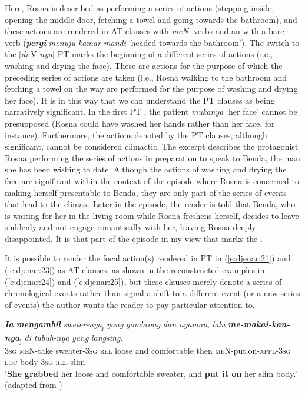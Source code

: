 \documentclass[output=paper
,modfonts
,nonflat]{langsci/langscibook}
\begin{document}
\noindent\largerpage
Here, Rosna is described as performing a series of actions (stepping inside, opening the middle door, fetching a towel and going towards the bathroom), and these actions are rendered in AT clauses with \textit{meN}- verbs and an  with a bare verb (\textbf{\textit{pergi}} \textit{menuju kamar mandi} ‘headed towards the bathroom’). The switch to the [\textit{di}-V-\textit{nya}] PT  marks the beginning of a different series of actions (i.e., washing and drying the face). These are actions for the purpose of which the preceding series of actions are taken (i.e., Rosna walking to the bathroom and fetching a towel on the way are performed for the purpose of washing and drying her face). It is in this way that we can understand the PT clauses as being narratively significant. In the first PT , the patient \textit{mukanya} ‘her face’ cannot be presupposed (Rosna could have washed her hands rather than her face, for instance). Furthermore, the actions denoted by the PT clauses, although significant, cannot be considered climactic. The excerpt describes the protagonist Rosna performing the series of actions in preparation to speak to Benda, the man she has been wishing to date. Although the actions of washing and drying the face are significant within the context of the episode where Rosna is concerned to making herself presentable to Benda, they are only part of the series of events that lead to the climax. Later in the episode, the reader is told that Benda, who is waiting for her in the living room while Rosna freshens herself, decides to leave suddenly and not engage romantically with her, leaving Rosna deeply disappointed. It is that part of the episode in my view that marks the .  

It is possible to render the focal action(s) rendered in PT in (\ref{e:djenar:21}) and (\ref{e:djenar:23}) as AT clauses, as shown in the reconstructed examples in (\ref{e:djenar:24}) and (\ref{e:djenar:25}), but these clauses merely denote a series of chronological events rather than signal a shift to a different event (or a new series of events) the author wants the reader to pay particular attention to.

\begin{exe}
	\ex\label{e:djenar:24}
	\gll \textbf{\textit{Ia}} \textbf{\textit{mengambil}} \textit{sweter-nya}\textsubscript{j} \textit{yang} \textit{gombrong} \textit{dan} \textit{nyaman}, \textit{lalu} \textbf{\textit{me-makai-kan-nya}}\textsubscript{j} \textit{di} \textit{tubuh}-\textit{nya} \textit{yang} \textit{langsing}.\\
	3\textsc{sg} \textsc{meN}-take sweater-3\textsc{sg} \textsc{rel} loose and comfortable then \textsc{meN}-put.on-\textsc{appl}-3\textsc{sg}  \textsc{loc} body-3\textsc{sg} \textsc{rel} slim\\
	\glt ‘\textbf{She} \textbf{grabbed} her loose and comfortable sweater, and \textbf{put it on} her slim body.’ \hfill (adapted from \citealt[7]{Karina2008})
\end{exe}
\end{document}
